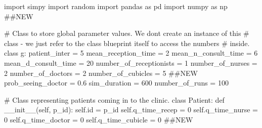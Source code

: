 \documentclass[
  letterpaper,
  DIV=11,
  numbers=noendperiod]{scrreprt}
\newenvironment{Shaded}{}{}
\newcommand{\BuiltInTok}[1]{\textcolor[rgb]{0.84,0.23,0.29}{#1}}
\newcommand{\CommentTok}[1]{\textcolor[rgb]{0.42,0.45,0.49}{#1}}
\newcommand{\DecValTok}[1]{\textcolor[rgb]{0.00,0.36,0.77}{#1}}
\newcommand{\FloatTok}[1]{\textcolor[rgb]{0.00,0.36,0.77}{#1}}
\newcommand{\FunctionTok}[1]{\textcolor[rgb]{0.44,0.26,0.76}{#1}}
\newcommand{\ImportTok}[1]{\textcolor[rgb]{0.01,0.18,0.38}{#1}}
\newcommand{\KeywordTok}[1]{\textcolor[rgb]{0.84,0.23,0.29}{#1}}
\newcommand{\NormalTok}[1]{\textcolor[rgb]{0.14,0.16,0.18}{#1}}
\newcommand{\OperatorTok}[1]{\textcolor[rgb]{0.14,0.16,0.18}{#1}}
\newcommand{\VariableTok}[1]{\textcolor[rgb]{0.89,0.38,0.04}{#1}}
\begin{document}
\begin{tcolorbox}[enhanced jigsaw, colframe=quarto-callout-note-color-frame, bottomtitle=1mm, breakable, rightrule=.15mm, coltitle=black, colbacktitle=quarto-callout-note-color!10!white, opacityback=0, leftrule=.75mm, arc=.35mm, toptitle=1mm, title=\textcolor{quarto-callout-note-color}{\faInfo}\hspace{0.5em}{Click here to view the full code}, titlerule=0mm, colback=white, toprule=.15mm, bottomrule=.15mm, left=2mm, opacitybacktitle=0.6]

\begin{Shaded}
\begin{Highlighting}[]
\ImportTok{import}\NormalTok{ simpy}
\ImportTok{import}\NormalTok{ random}
\ImportTok{import}\NormalTok{ pandas }\ImportTok{as}\NormalTok{ pd}
\ImportTok{import}\NormalTok{ numpy }\ImportTok{as}\NormalTok{ np }\CommentTok{\#\#NEW}

\CommentTok{\# Class to store global parameter values.  We don\textquotesingle{}t create an instance of this}
\CommentTok{\# class {-} we just refer to the class blueprint itself to access the numbers}
\CommentTok{\# inside.}
\KeywordTok{class}\NormalTok{ g:}
\NormalTok{    patient\_inter }\OperatorTok{=} \DecValTok{5}
\NormalTok{    mean\_reception\_time }\OperatorTok{=} \DecValTok{2}
\NormalTok{    mean\_n\_consult\_time }\OperatorTok{=} \DecValTok{6}
\NormalTok{    mean\_d\_consult\_time }\OperatorTok{=} \DecValTok{20}
\NormalTok{    number\_of\_receptionists }\OperatorTok{=} \DecValTok{1}
\NormalTok{    number\_of\_nurses }\OperatorTok{=} \DecValTok{2}
\NormalTok{    number\_of\_doctors }\OperatorTok{=} \DecValTok{2}
\NormalTok{    number\_of\_cubicles }\OperatorTok{=} \DecValTok{5} \CommentTok{\#\#NEW}
\NormalTok{    prob\_seeing\_doctor }\OperatorTok{=} \FloatTok{0.6}
\NormalTok{    sim\_duration }\OperatorTok{=} \DecValTok{600}
\NormalTok{    number\_of\_runs }\OperatorTok{=} \DecValTok{100}

\CommentTok{\# Class representing patients coming in to the clinic.}
\KeywordTok{class}\NormalTok{ Patient:}
    \KeywordTok{def} \FunctionTok{\_\_init\_\_}\NormalTok{(}\VariableTok{self}\NormalTok{, p\_id):}
        \VariableTok{self}\NormalTok{.}\BuiltInTok{id} \OperatorTok{=}\NormalTok{ p\_id}
        \VariableTok{self}\NormalTok{.q\_time\_recep }\OperatorTok{=} \DecValTok{0}
        \VariableTok{self}\NormalTok{.q\_time\_nurse }\OperatorTok{=} \DecValTok{0}
        \VariableTok{self}\NormalTok{.q\_time\_doctor }\OperatorTok{=} \DecValTok{0}
        \VariableTok{self}\NormalTok{.q\_time\_cubicle }\OperatorTok{=} \DecValTok{0} \CommentTok{\#\#NEW}


\end{Highlighting}
\end{Shaded}
\end{tcolorbox}
\end{document}

